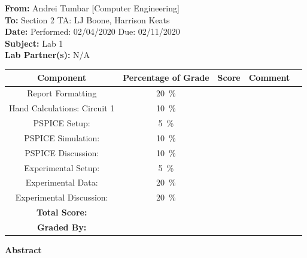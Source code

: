 \documentclass[11pt]{article}
\begin{document}
\Large
\textbf{From:} Andrei Tumbar [Computer Engineering] \\
\textbf{To: } Section 2 TA: LJ Boone, Harrison Keats \\
\textbf{Date: } Performed: 02/04/2020  Due: 02/11/2020 \\
\textbf{Subject: } Lab 1\\
\textbf{Lab Partner(s): } N/A\\
\vspace{0.5in}
	\begin{table}[h!]
		\centering
		\label{Table:Grading Table 1}
		\begin{tabular}{|c||c|c|c|c|}
			\hline
			Component & Percentage of Grade   & Score \hspace{0.25in} & Comment \hspace{1in}  \\
			\hline
			Report Formatting & 20~\si{\percent} & & \\	 
			\hline 
			Hand Calculations: Circuit 1 & 10~\si{\percent} & & \\
			\hline	
			PSPICE Setup: & 5~\si{\si{\percent}}&&\\
			\hline
			PSPICE Simulation:  & 10~\si{\percent} & & \\
			\hline
			PSPICE Discussion:  & 10~\si{\percent} & & \\
			\hline
			Experimental Setup: & 5~\si{\percent} & & \\
			\hline
		    Experimental Data:  & 20~\si{\percent} & & \\	
			\hline
			Experimental Discussion:  & 20~\si{\percent} & & \\	 
			\hline
			\textbf{Total Score:}&  & & \\	 
			\hline
			\textbf{Graded By:}&  & & \\	 
			\hline
			
		\end{tabular}
	\end{table}
\newpage
\Large \textbf{Abstract} \\
\normalsize
\end{document}
